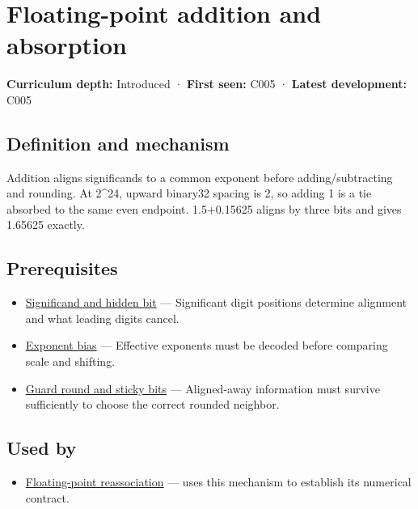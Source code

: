 \hypertarget{appendix-a1b1b4580dfd}{}
\section{Floating-point addition and absorption}\label{appendix-a1b1b4580dfd-floating-point-addition-and-absorption}

\textbf{Curriculum depth:} Introduced · \textbf{First seen:} C005 · \textbf{Latest development:} C005

\subsection{Definition and mechanism}\label{appendix-a1b1b4580dfd-definition-and-mechanism}

Addition aligns significands to a common exponent before adding/subtracting and rounding. At 2\^{}24, upward binary32 spacing is 2, so adding 1 is a tie absorbed to the same even endpoint. 1.5+0.15625 aligns by three bits and gives 1.65625 exactly.

\subsection{Prerequisites}\label{appendix-a1b1b4580dfd-prerequisites}

\begin{itemize}
\tightlist
\item
  \hyperref[appendix-a24fd710cf67]{Significand and hidden bit} --- Significant digit positions determine alignment and what leading digits cancel.
\item
  \hyperref[appendix-2fae058c82e1]{Exponent bias} --- Effective exponents must be decoded before comparing scale and shifting.
\item
  \hyperref[appendix-b572b631069b]{Guard round and sticky bits} --- Aligned-away information must survive sufficiently to choose the correct rounded neighbor.
\end{itemize}

\subsection{Used by}\label{appendix-a1b1b4580dfd-used-by}

\begin{itemize}
\tightlist
\item
  \hyperref[appendix-c2ac4a84c283]{Floating-point reassociation} --- uses this mechanism to establish its numerical contract.
\end{itemize}

